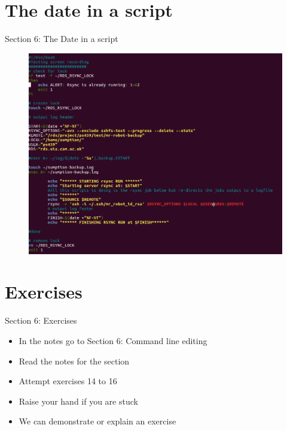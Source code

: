 \section{The date in a script}
\begin{frame}{Section 6: The Date in a script}
\begin{figure}[h]
\includegraphics[height=0.8\textheight]{imgs/script-date.png}
\end{figure}
\end{frame}

\section{Exercises}
\begin{frame}{Section 6: Exercises}
\begin{itemize}
\item In the notes go to {Section 6: Command line editing}
\item Read the notes for the section 
\item Attempt exercises 14 to 16
\item Raise your hand if you are stuck
\item We can demonstrate or explain an exercise
\end{itemize}
\end{frame}

